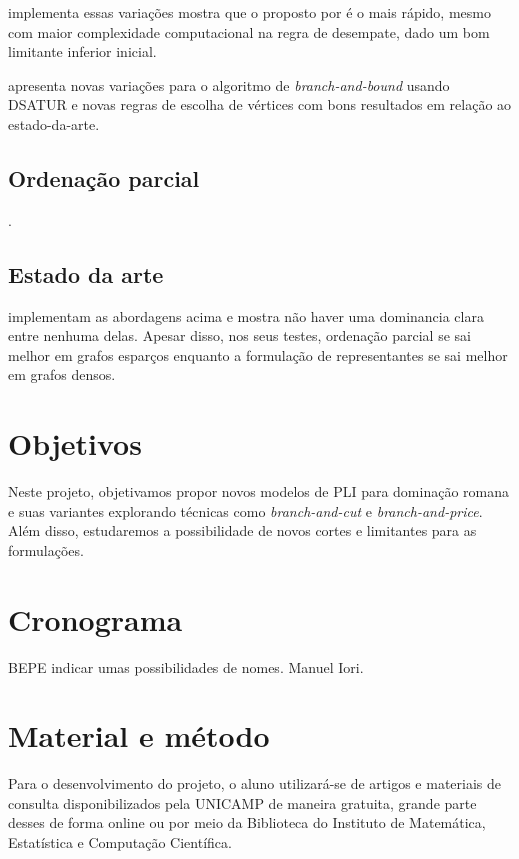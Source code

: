 \documentclass[11pt]{article}
\begin{document}
\textcite{Ternier2017ExactAlgorithmsVertex} implementa essas variações mostra que o proposto por \textcite{Sewell1996improvedalgorithmexact} é o mais rápido, mesmo com maior complexidade computacional na regra de desempate, dado um bom limitante inferior inicial.

\textcite{Ternier2017ExactAlgorithmsVertex} apresenta novas variações para o algoritmo de \emph{branch-and-bound} usando DSATUR e novas regras de escolha de vértices com bons resultados em relação ao estado-da-arte.
\subsection{Ordenação parcial}
\label{sec:orgaa3237e}
\textcites{Jabrayilov2018NewIntegerLinear}[][]{Jabrayilov2022StrengthenedPartialOrdering}.
\subsection{Estado da arte}
\label{sec:org000ba83}
\textcite{Jabrayilov2018NewIntegerLinear} implementam as abordagens acima e mostra não haver uma dominancia clara entre nenhuma delas.
Apesar disso, nos seus testes, ordenação parcial se sai melhor em grafos esparços enquanto a formulação de representantes se sai melhor em grafos densos.
\section{Objetivos}
\label{sec:org3316ab1}
Neste projeto, objetivamos propor novos modelos de PLI para dominação romana e suas variantes explorando técnicas como \emph{branch-and-cut} e \emph{branch-and-price}.
Além disso, estudaremos a possibilidade de novos cortes e limitantes para as formulações.

\textcite{Lima2022Exactsolutionnetwork}
\textcite{Pessoa2021SolvingBinPacking}
\section{Cronograma}
\label{sec:orga18f812}
BEPE indicar umas possibilidades de nomes. Manuel Iori.

\section{Material e método}
\label{sec:orgb05da2e}
Para o desenvolvimento do projeto, o aluno utilizará-se de artigos e materiais de consulta disponibilizados pela UNICAMP de maneira gratuita, grande parte desses de forma online ou por meio da Biblioteca do Instituto de Matemática, Estatística e Computação Científica.
\end{document}
